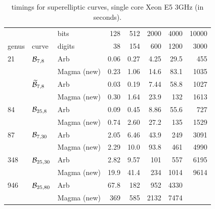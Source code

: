\documentclass[main.tex]{subfiles}
\begin{document}
  \begin{table}[H]
      \begin{center}
          \begin{tabular}{lllrrrrr}
              \toprule
              & & \hfill bits & 128 & 512 & 2000 & 4000 & 10000 \\
              genus & curve & \hfill digits & 38 & 154 & 600 & 1200 & 3000 \\
              \midrule
              21 & $\mathcal{B}_{7,8}$
              &   Arb         & 0.06 & 0.27   & 4.25    & 29.5    & 455 \\
              & & Magma (new) & 0.23  & 1.06  & 14.6  & 83.1   & 1035 \\
              \cmidrule{3-8}
              & $\widetilde{\mathcal{B}}_{7,8}$
              &   Arb         & 0.03 & 0.19  & 7.44    & 58.8   & 1027 \\
              & & Magma (new) & 0.30  & 1.64  & 23.9  & 132 & 1613 \\
              \midrule
              84 & $\mathcal{B}_{25,8}$
              &   Arb         & 0.09   & 0.45   & 8.86     & 55.6    & 727 \\
              & & Magma (new) & 0.74   & 2.60   & 27.2   & 135  & 1529 \\
              \midrule
              87 & $\mathcal{B}_{7,30}$
              &   Arb         & 2.05  & 6.46   & 43.9   & 249   & 3091 \\
              & & Magma (new) & 2.29  & 10.0 & 93.8  & 461  & 4990 \\
              \midrule
              348 & $\mathcal{B}_{25,30}$
              &   Arb         & 2.82   & 9.57    & 101  & 557   & 6195 \\
              & & Magma (new) & 19.9  & 41.4  & 234  & 1014 & 9614 \\
              \midrule
              946 & $\mathcal{B}_{25,80}$
              &   Arb         & 67.8  & 182  & 952   & 4330 \\
              & & Magma (new) & 369 & 585 & 2132 & 7474 \\
              \bottomrule
          \end{tabular}
          \caption{timings for superelliptic curves, single core Xeon E5 3GHz (in seconds).}
      \end{center}
  \end{table}


  \biblio
  
\end{document}
